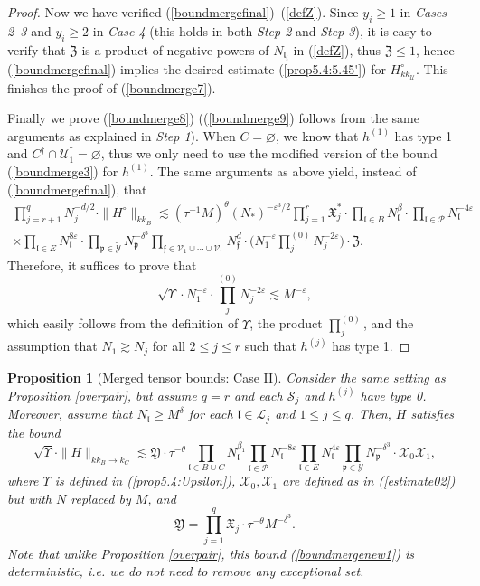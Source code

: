 \documentclass[11 pt,reqno]{amsart}
\newtheorem{prop}[thm]{Proposition}
\theoremstyle{definition}
\theoremstyle{remark}
\numberwithin{equation}{section}
\newcommand{\Sc}{\mathcal{S}}
\newcommand{\Lc}{\mathcal{L}}
\newcommand{\Pc}{\mathcal{P}}
\newcommand{\Uc}{\mathcal{U}}
\newcommand{\Vc}{\mathcal{V}}
\newcommand{\Xc}{\mathcal{X}}
\newcommand{\Yc}{\mathcal{Y}}
\newcommand{\pf}{\mathfrak{p}}
\newcommand{\ff}{\mathfrak{f}}
\newcommand{\Xf}{\mathfrak{X}}
\newcommand{\Zf}{\mathfrak{Z}}
\newcommand{\lf}{\mathfrak{l}}
\newcommand{\Yf}{\mathfrak{Y}}
\begin{document}
{\begin{proof}
 Now we have verified (\ref{boundmergefinal})--(\ref{defZ}). Since $y_i\geq 1$ in \emph{Cases 2--3} and $y_i\geq 2$ in \emph{Case 4} (this holds in both \emph{Step 2} and \emph{Step 3}), it is easy to verify that $\Zf$ is a product of negative powers of $N_{\lf_i}$ in (\ref{defZ}), thus $\Zf\leq 1$, hence (\ref{boundmergefinal}) implies the desired estimate (\ref{prop5.4:5.45'}) for $H_{kk_\Uc}^\circ$. This finishes the proof of (\ref{boundmerge7}).
 
 Finally we prove (\ref{boundmerge8}) ((\ref{boundmerge9}) follows from the same arguments as explained in \emph{Step 1}). When $C=\varnothing$, we know that $h^{(1)}$ has type 1 and $C^\dagger\cap \Uc_1^\dagger=\varnothing$, thus we only need to use the modified version of the bound (\ref{boundmerge3}) for $h^{(1)}$. The same arguments as above yield, instead of (\ref{boundmergefinal}), that
 \begin{multline}\label{boundmergefinal3}\prod_{j=r+1}^q N_j^{-d/2}\cdot\|H^\circ\|_{kk_{B}}\lesssim(\tau^{-1}M)^\theta (N_*)^{-\varepsilon^3/2}
\prod_{j=1}^r\Xf_j^*\cdot\prod_{\lf\in B}N_\lf^\beta\cdot\prod_{\lf\in\Pc}N_\lf^{-4\varepsilon}\\\times\prod_{\lf\in E}N_\lf^{8\varepsilon}\cdot\prod_{\pf\in\widetilde{\Yc}}N_\pf^{-\delta^3}\prod_{\ff \in \Vc_1\cup\cdots\cup\Vc_r} N_\ff^d\cdot \bigg(N_1^{-\varepsilon}\prod_{j}^{(0)}N_j^{-2\varepsilon}\bigg)\cdot\Zf.
 \end{multline} Therefore, it suffices to prove that
 \[\sqrt{\Upsilon}\cdot N_1^{-\varepsilon}\cdot \prod_{j}^{(0)}N_j^{-2\varepsilon}\lesssim M^{-\varepsilon},\] which easily follows from the definition of $\Upsilon$, the product $\prod_j^{(0)}$, and the assumption that $N_1\gtrsim N_j$ for all $2\leq j\leq r$ such that $h^{(j)}$ has type 1.
\end{proof}
\begin{prop}[Merged tensor bounds: Case II]\label{overpair2} Consider the same setting as Proposition \ref{overpair}, but assume $q=r$ and each $\Sc_j$ and $h^{(j)}$ have type 0. Moreover, assume that $N_\lf\geq M^\delta$ for each $\lf\in\Lc_j$ and $1\leq j\leq q$. Then, $H$ satisfies the bound 
\begin{equation}\label{boundmergenew1}\sqrt{\Upsilon}\cdot\|H\|_{kk_{B}\to k_{C}}\lesssim\Yf\cdot\tau^{-\theta}\prod_{\lf\in B\cup C} N_\lf^{\beta_1}\prod_{\lf\in\Pc}N_\lf^{-8\varepsilon}\prod_{\lf\in E}N_\lf^{4\varepsilon}\prod_{\pf\in\Yc}N_\pf^{-\delta^3}\cdot\Xc_{0}\Xc_{1},
\end{equation} where $\Upsilon$ is defined in (\ref{prop5.4:Upsilon}), $\Xc_0, \Xc_1$ are defined as in (\ref{estimate02}) but with $N$ replaced by $M$, and
\begin{equation}\label{boundmergenew2}\Yf=\prod_{j=1}^q\Xf_j\cdot \tau^{-\theta}M^{-\delta^3}.
\end{equation}
 Note that unlike Proposition \ref{overpair}, this bound (\ref{boundmergenew1}) is deterministic, i.e. we do not need to remove any exceptional set.
\end{prop}

}
\end{document}
